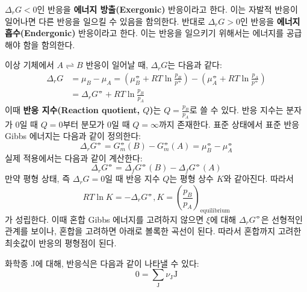         $\Delta_r G<0$인 반응을 \textbf{에너지 방출(Exergonic)} 반응이라고 한다. 이는 자발적 반응이 일어나면 다른 반응을 일으킬 수 있음을 
        함의한다. 반대로 $\Delta_r G>0$인 반응을 \textbf{에너지 흡수(Endergonic)} 반응이라고 한다. 이는 반응을 일으키기 위해서는 에너지를 
        공급해야 함을 함의한다.
        \par 이상 기체에서 $A \rightleftharpoons B$ 반응이 일어날 때, $\Delta_r G$는 다음과 같다:
        \begin{equation*}
            \begin{aligned}
                \Delta_r G &=\mu_B -\mu_A = \left(\mu_B^\circlehbar + RT\ln{\frac{p_B}{p^\circlehbar}}\right) - \left(\mu_A^\circlehbar + RT\ln{\frac{p_A}{p^\circlehbar}}\right)\\
                &= \Delta_r G^\circlehbar + RT\ln{\frac{p_B}{p_A}}
            \end{aligned}
        \end{equation*}
        이때 \textbf{반응 지수(Reaction quotient, $Q$)}는 $Q=\frac{p_B}{p_A}$로 쓸 수 있다. 반응 지수는 분자가 0일 때 $Q=0$부터 
        분모가 0일 때 $Q=\infty$까지 존재한다. 표준 상태에서 표준 반응 Gibbs 에너지는 다음과 같이 정의한다:
        \begin{equation*}
            \Delta_r G^\circlehbar = G_m^\circlehbar\left(B\right)-G_m^\circlehbar\left(A\right)=\mu_B^\circlehbar-\mu_A^\circlehbar
        \end{equation*}
        실제 적용에서는 다음과 같이 계산한다:
        \begin{equation*}
            \Delta_r G^\circlehbar = \Delta_f G^\circlehbar \left(B\right)-\Delta_f G^\circlehbar \left(A\right)
        \end{equation*}
        만약 평형 상태, 즉 $\Delta_r G = 0$일 때 반응 지수 $Q$는 평형 상수 $K$와 같아진다. 따라서
        \begin{equation*}
            RT \ln{K}=-\Delta_r G^\circlehbar, K=\left(\frac{p_B}{p_A}\right)_\mathrm{equilibrium}
        \end{equation*}
        가 성립한다. 이때 혼합 Gibbs 에너지를 고려하지 않으면 $\xi$에 대해 $\Delta_r G^\circlehbar$은 선형적인 관계를 보이나, 혼합을 
        고려하면 아래로 볼록한 곡선이 된다. 따라서 혼합까지 고려한 최솟값이 반응의 평형점이 된다.
        \par 화학종 J에 대해, 반응식은 다음과 같이 나타낼 수 있다:
        \begin{equation*}
            0=\sum_\mathrm{J} \nu_\mathrm{J} \mathrm{J}
        \end{equation*}

